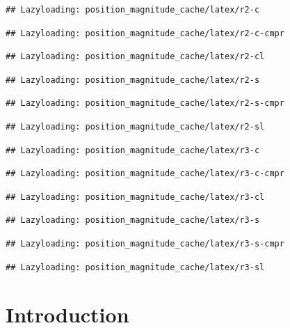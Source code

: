 \documentclass[journal]{vgtc}                %
\begin{document}
\begin{verbatim}
## Lazyloading: position_magnitude_cache/latex/r2-c
\end{verbatim}

\begin{verbatim}
## Lazyloading: position_magnitude_cache/latex/r2-c-cmpr
\end{verbatim}

\begin{verbatim}
## Lazyloading: position_magnitude_cache/latex/r2-cl
\end{verbatim}

\begin{verbatim}
## Lazyloading: position_magnitude_cache/latex/r2-s
\end{verbatim}

\begin{verbatim}
## Lazyloading: position_magnitude_cache/latex/r2-s-cmpr
\end{verbatim}

\begin{verbatim}
## Lazyloading: position_magnitude_cache/latex/r2-sl
\end{verbatim}

\begin{verbatim}
## Lazyloading: position_magnitude_cache/latex/r3-c
\end{verbatim}

\begin{verbatim}
## Lazyloading: position_magnitude_cache/latex/r3-c-cmpr
\end{verbatim}

\begin{verbatim}
## Lazyloading: position_magnitude_cache/latex/r3-cl
\end{verbatim}

\begin{verbatim}
## Lazyloading: position_magnitude_cache/latex/r3-s
\end{verbatim}

\begin{verbatim}
## Lazyloading: position_magnitude_cache/latex/r3-s-cmpr
\end{verbatim}

\begin{verbatim}
## Lazyloading: position_magnitude_cache/latex/r3-sl
\end{verbatim}

\hypertarget{introduction}{%
\section*{Introduction}\label{introduction}}
\end{document}
